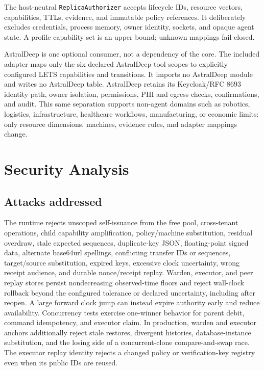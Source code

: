 \documentclass[10pt]{article}
\newcommand{\code}[1]{\nolinkurl{#1}}
\begin{document}
The host-neutral \code{ReplicaAuthorizer} accepts lifecycle IDs, resource vectors, capabilities,
TTLs, evidence, and immutable policy references. It deliberately excludes credentials, process
memory, owner identity, sockets, and opaque agent state. A profile capability set is an upper
bound; unknown mappings fail closed.

AstralDeep is one optional consumer, not a dependency of the core. The included adapter maps only
the six declared AstralDeep tool scopes to explicitly configured LETS capabilities and
transitions. It imports no AstralDeep module and writes no AstralDeep table. AstralDeep retains its
Keycloak/RFC 8693 identity path, owner isolation, permissions, PHI and egress checks, confirmations,
and audit. This same separation supports non-agent domains such as robotics, logistics,
infrastructure, healthcare workflows, manufacturing, or economic limits: only resource dimensions,
machines, evidence rules, and adapter mappings change.

\section{Security Analysis}

\subsection{Attacks addressed}

The runtime rejects unscoped self-issuance from the free pool, cross-tenant operations, child
capability amplification, policy/machine substitution, residual overdraw, stale expected
sequences, duplicate-key JSON, floating-point signed data, alternate base64url spellings,
conflicting transfer IDs or sequences, target/source substitution, expired keys, excessive clock
uncertainty, wrong receipt audience, and durable nonce/receipt replay. Warden, executor, and peer
replay stores persist nondecreasing observed-time floors and reject wall-clock rollback beyond the
configured tolerance or declared uncertainty, including after reopen. A large forward clock jump
can instead expire authority early and reduce availability. Concurrency tests exercise one-winner
behavior for parent debit, command idempotency, and executor claim. In production, warden and
executor anchors additionally reject stale restores, divergent histories, database-instance
substitution, and the losing side of a concurrent-clone compare-and-swap race. The executor replay
identity rejects a changed policy or verification-key registry even when its public IDs are reused.
\end{document}
